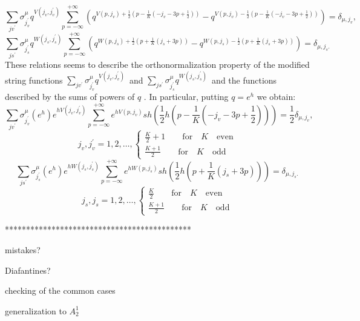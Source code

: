 \documentclass{article}
\begin{document}
\begin{equation*}
\sum_{jv^{\prime }}\sigma _{j_{v}^{\prime }}^{\mu }q^{V\left(
j_{v},j_{v}^{\prime }\right) }\sum_{p=-\infty }^{+\infty }\left( q^{V\left(
p,j_{v}\right) +\frac{1}{2}\left( p-\frac{1}{K}\left( -j_{v}-3p+\frac{1}{2}%
\right) \right) }-q^{V\left( p,j_{v}\right) -\frac{1}{2}\left( p-\frac{1}{K}%
\left( -j_{v}-3p+\frac{1}{2}\right) \right) }\right) =\delta _{\mu ,j_{v}},
\end{equation*}
\begin{equation*}
\sum_{js^{\prime }}\sigma _{j_{s}^{\prime }}^{\mu }q^{W\left(
j_{s},j_{s}^{\prime }\right) }\sum_{p=-\infty }^{+\infty }\left( q^{W\left(
p,j_{s}\right) +\frac{1}{2}\left( p+\frac{1}{K}\left( j_{s}+3p\right)
\right) }-q^{W\left( p,j_{s}\right) -\frac{1}{2}\left( p+\frac{1}{K}\left(
j_{s}+3p\right) \right) }\right) =\delta _{\mu ,j_{s}.}
\end{equation*}
These relations seems to describe the orthonormalization property of the
modified string functions $\sum_{jv^{\prime }}\sigma _{j_{v}^{\prime }}^{\mu
}q^{V\left( j_{v},j_{v}^{\prime }\right) }$\ and $\sum_{js^{\prime }}\sigma
_{j_{s}^{\prime }}^{\mu }q^{W\left( j_{s},j_{s}^{\prime }\right) }$\ and the
functions described by the sums of powers of $q$ . In particular, putting $%
q=e^{h}$ we obtain: 
\begin{equation*}
\sum_{jv^{\prime }}\sigma _{j_{v}^{\prime }}^{\mu }\left( e^{h}\right)
e^{hV\left( j_{v},j_{v}^{\prime }\right) }\sum_{p=-\infty }^{+\infty
}e^{hV\left( p,j_{v}\right) }sh\left( \frac{1}{2}h\left( p-\frac{1}{K}\left(
-j_{v}-3p+\frac{1}{2}\right) \right) \right) =\frac{1}{2}\delta _{\mu
,j_{v}},
\end{equation*}
\begin{equation*}
j_{v},j_{v}^{\prime }=1,2,\ldots ,\left\{ 
\begin{array}{c}
\frac{K}{2}+1\qquad \mathrm{for\quad }K\mathrm{\quad even} \\ 
\frac{K+1}{2}\qquad \mathrm{for\quad }K\mathrm{\quad odd}
\end{array}
\right. 
\end{equation*}
\begin{equation*}
\sum_{js^{\prime }}\sigma _{j_{s}^{\prime }}^{\mu }\left( e^{h}\right)
e^{hW\left( j_{s},j_{s}^{\prime }\right) }\sum_{p=-\infty }^{+\infty
}e^{hW\left( p,j_{s}\right) }sh\left( \frac{1}{2}h\left( p+\frac{1}{K}\left(
j_{s}+3p\right) \right) \right) =\delta _{\mu ,j_{s}.}
\end{equation*}
\begin{equation*}
j_{s},j_{s}=1,2,\ldots ,\left\{ 
\begin{array}{c}
\frac{K}{2}\qquad \mathrm{for\quad }K\mathrm{\quad even} \\ 
\frac{K+1}{2}\qquad \mathrm{for\quad }K\mathrm{\quad odd}
\end{array}
\right. 
\end{equation*}

********************************************

mistakes?

Diafantines?

checking of the common cases

generalization to $A_{2}^{1}$
\end{document}
